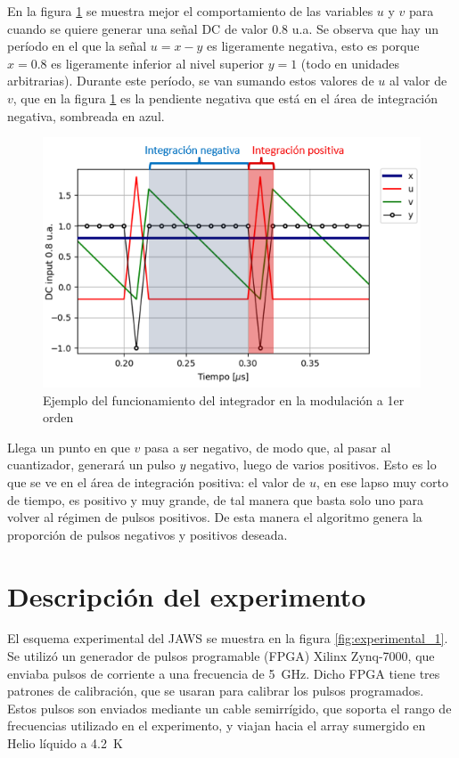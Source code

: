 \documentclass[twoside]{article}
\begin{document}
\begin{multicols}{2}
En la figura \ref{fig:integrador} se muestra mejor el comportamiento de las variables $u$ y $v$ para cuando se quiere generar una señal DC de valor 0.8 u.a. Se observa que hay un período en el que la señal $u=x-y$ es ligeramente negativa, esto es porque $x=0.8$ es ligeramente inferior al nivel superior $y=1$ (todo en unidades arbitrarias). Durante este período, se van sumando estos valores de $u$ al valor de $v$, que en la figura \ref{fig:integrador} es la pendiente negativa que está en el área de integración negativa, sombreada en azul.


\begin{figure}[H]
\centering
\includegraphics[width=\linewidth]{figuras/integracion.png}
\caption{Ejemplo del funcionamiento del integrador en la modulación a 1er orden}
\label{fig:integrador}
\end{figure}

Llega un punto en que $v$ pasa a ser negativo, de modo que, al pasar al cuantizador, generará un pulso $y$ negativo, luego de varios positivos. Esto es lo que se ve en el área de integración positiva: el valor de $u$, en ese lapso muy corto de tiempo, es positivo y muy grande, de tal manera que basta solo uno para volver al régimen de pulsos positivos. De esta manera el algoritmo genera la proporción de pulsos negativos y positivos deseada.

\section{Descripción del experimento}

El esquema experimental del JAWS se muestra en la figura \ref{fig:experimental_1}. Se utilizó un generador de pulsos programable (FPGA) Xilinx Zynq-7000, que enviaba pulsos de corriente a una frecuencia de \SI{5}{\giga\hertz}. Dicho FPGA tiene tres patrones de calibración, que se usaran para calibrar los pulsos programados. Estos pulsos son enviados mediante un cable semirrígido, que soporta el rango de frecuencias utilizado en el experimento, y viajan hacia el array sumergido en Helio líquido a \SI{4.2}{\kelvin}


\end{multicols}
\end{document}
